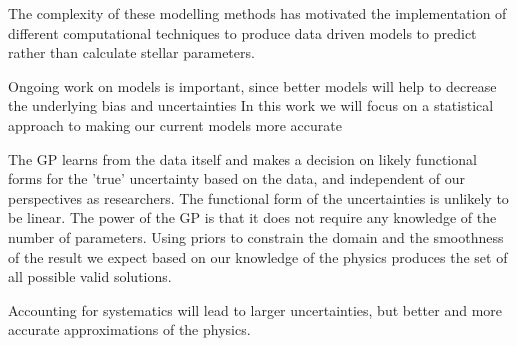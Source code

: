 The complexity of these modelling methods has motivated the implementation of different computational techniques to produce data driven models to predict rather than calculate stellar parameters.

Ongoing work on models is important, since better models will help to decrease the underlying bias and uncertainties
In this work we will focus on a statistical approach to making our current models more accurate


% 

The GP learns from the data itself and makes a decision on likely functional forms for the 'true' uncertainty based on the data, and independent of our perspectives as researchers.
The functional form of the uncertainties is unlikely to be linear.
The power of the GP is that it does not require any knowledge of the number of parameters.
Using priors to constrain the domain and the smoothness of the result we expect based on our knowledge of the physics produces the set of all possible valid solutions.

Accounting for systematics will lead to larger uncertainties, but better and more accurate approximations of the physics.
